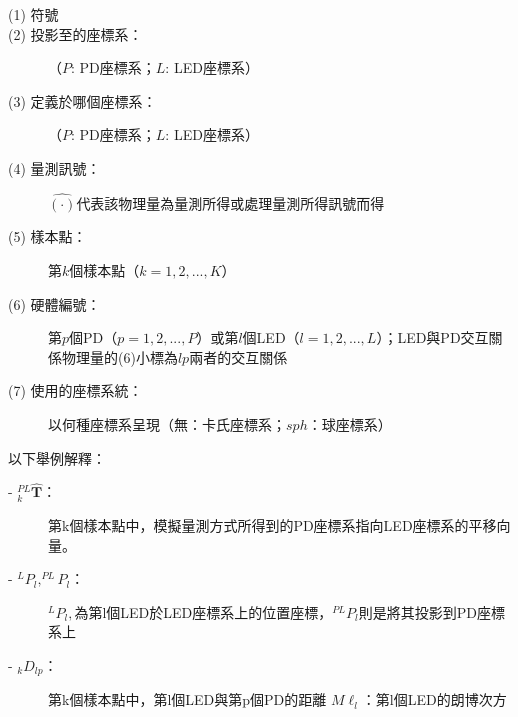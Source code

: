 \begin{description}
    \item[(1) 符號] 
    \item[(2) 投影至的座標系：] （$P$: PD座標系；$L$: LED座標系）
    \item[(3) 定義於哪個座標系：] （$P$: PD座標系；$L$: LED座標系）
    \item[(4) 量測訊號：] $\hat{(\cdot)}$代表該物理量為量測所得或處理量測所得訊號而得
    \item[(5) 樣本點：] 第$k$個樣本點（$k=1,2,...,K$）
    \item[(6) 硬體編號：] 第$p$個PD（$p=1,2,...,P$）或第$l$個LED（$l=1,2,...,L$）；LED與PD交互關係物理量的(6)小標為$lp$兩者的交互關係
    \item[(7) 使用的座標系統：]  以何種座標系呈現（無：卡氏座標系；$sph$：球座標系）
\end{description}


\onehalfspacing

以下舉例解釋：
\begin{description}
\item[- $^{PL}_{k}\hat{\boldsymbol{T}}$：]第k個樣本點中，模擬量測方式所得到的PD座標系指向LED座標系的平移向量。

\item[- $^{L}P_l,^{PL}P_l$：]$^{L}P_l,$為第l個LED於LED座標系上的位置座標，$^{PL}P_l$則是將其投影到PD座標系上

\item[- $_{k}D_{l p}$：]第k個樣本點中，第l個LED與第p個PD的距離
$M\ell_l$：第l個LED的朗博次方
\end{description}